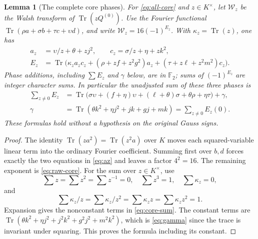 \documentclass[11pt,a4paper]{article}
\newtheorem{lemma}[theorem]{Lemma}
\theoremstyle{definition}
\theoremstyle{remark}
\numberwithin{equation}{section}
\newcommand{\F}{\mathbb F}
\newcommand{\Tr}{\operatorname{Tr}}
\newcommand{\Walsh}{\mathcal W}
\begin{document}
\begin{lemma}[The complete core phases]\label{lem:core-phase}
For \eqref{eq:all-core} and \(z\in K^\times\), let \(\Walsh_z\) be
the Walsh transform of \(\Tr(zQ^{(0)})\). Use the Fourier
functional \(\Tr(\rho a+\sigma b+\tau c+\upsilon d)\), and write
\(\Walsh_z=16(-1)^{E_z}\). With \(\kappa_z=\Tr(z)\), one has
\begin{align}
 a_z&=\upsilon/z+\theta+zj^2,\qquad
 c_z=\sigma/z+\eta+zk^2,\label{eq:az}\\
 E_z&=\Tr\bigl(\kappa_z a_zc_z+
       (\rho+zf+z^2g^2)a_z+(\tau+z\ell+z^2m^2)c_z\bigr).
                                                    \label{eq:raw-core}
\end{align}
Phase additions, including \(\sum E_z\) and \(\gamma\) below, are in
\(\F_2\); sums of \((-1)^{E_z}\) are integer character sums.
In particular the \emph{unadjusted} sum of these three phases is
\begin{align}
 \sum_{z\ne0}E_z
 &=\Tr\bigl(\sigma\upsilon+(f+\eta)\upsilon
          +(\ell+\theta)\sigma+\theta\rho+\eta\tau\bigr)+\gamma,
                                                        \label{eq:core-sum}\\
 \gamma&=\Tr(\theta k^2+\eta j^2+jk+gj+mk)
         =\sum_{z\ne0}E_z(0).                         \label{eq:gamma}
\end{align}
These formulas hold without a hypothesis on the original Gauss signs.
\end{lemma}
\begin{proof}
The identity \(\Tr(za^2)=\Tr(z^2a)\) over \(K\) moves each
squared-variable linear term into the ordinary Fourier coefficient.
Summing first over \(b,d\) forces exactly the two equations in
\eqref{eq:az} and leaves a factor \(4^2=16\).
The remaining exponent is \eqref{eq:raw-core}.
For the sum over \(z\in K^\times\), use
\[
 \sum z=\sum z^2=\sum z^{-1}=0,\quad \sum z^3=1,\quad
 \sum\kappa_z=0,
\]
and
\[
 \sum\kappa_z/z=\sum\kappa_z/z^2
 =\sum\kappa_z z=\sum\kappa_z z^2=1.
\]
Expansion gives the nonconstant terms in \eqref{eq:core-sum}.
The constant terms are
\(\Tr(\theta k^2+\eta j^2+j^2k^2+g^2j^2+m^2k^2)\),
which is \eqref{eq:gamma} since the trace is invariant under squaring.
This proves the formula including its constant.
\end{proof}
\end{document}
